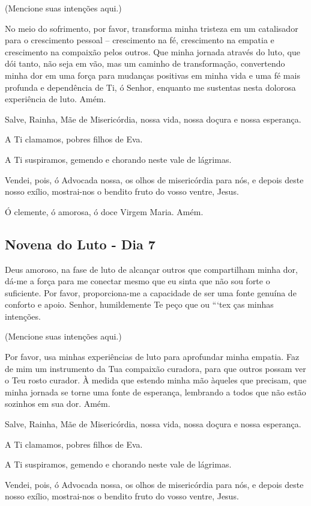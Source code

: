 \documentclass[18pt]{article}
\begin{document}
(Mencione suas intenções aqui.)

No meio do sofrimento, por favor, transforma minha tristeza em um catalisador para o crescimento pessoal – crescimento na fé, crescimento na empatia e crescimento na compaixão pelos outros. Que minha jornada através do luto, que dói tanto, não seja em vão, mas um caminho de transformação, convertendo minha dor em uma força para mudanças positivas em minha vida e uma fé mais profunda e dependência de Ti, ó Senhor, enquanto me sustentas nesta dolorosa experiência de luto. Amém.

Salve, Rainha, Mãe de Misericórdia, nossa vida, nossa doçura e nossa esperança.

A Ti clamamos, pobres filhos de Eva.

A Ti suspiramos, gemendo e chorando neste vale de lágrimas.

Vendei, pois, ó Advocada nossa, os olhos de misericórdia para nós, e depois deste nosso exílio, mostrai-nos o bendito fruto do vosso ventre, Jesus.

Ó clemente, ó amorosa, ó doce Virgem Maria. Amém.

\subsection{Novena do Luto - Dia 7}
Deus amoroso, na fase de luto de alcançar outros que compartilham minha dor, dá-me a força para me conectar mesmo que eu sinta que não sou forte o suficiente. Por favor, proporciona-me a capacidade de ser uma fonte genuína de conforto e apoio. Senhor, humildemente Te peço que ou ```tex
ças minhas intenções.

(Mencione suas intenções aqui.)

Por favor, usa minhas experiências de luto para aprofundar minha empatia. Faz de mim um instrumento da Tua compaixão curadora, para que outros possam ver o Teu rosto curador. À medida que estendo minha mão àqueles que precisam, que minha jornada se torne uma fonte de esperança, lembrando a todos que não estão sozinhos em sua dor. Amém.

Salve, Rainha, Mãe de Misericórdia, nossa vida, nossa doçura e nossa esperança.

A Ti clamamos, pobres filhos de Eva.

A Ti suspiramos, gemendo e chorando neste vale de lágrimas.

Vendei, pois, ó Advocada nossa, os olhos de misericórdia para nós, e depois deste nosso exílio, mostrai-nos o bendito fruto do vosso ventre, Jesus.
\end{document}
